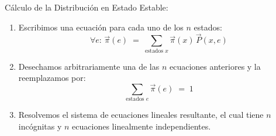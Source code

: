 \documentclass[ 10pt, xcolor = dvipsnames]{beamer}
\begin{document}
\begin{frame}[allowframebreaks]
\end{frame}

\begin{frame}[allowframebreaks]
\frametitle{\insertsubsection}

C\'alculo de la Distribuci\'on en Estado Estable: 
\begin{enumerate}
\item Escribimos una ecuaci\'on para cada uno de los $n$ estados: 
\[
\forall e \colon \, \vec{\pi}(e) \; = \; 
\sum_{\text{estados }x} \vec{\pi}(x) \, \vec{P}(x,e) 
\]
\item Desechamos arbitrariamente una de las $n$ ecuaciones anteriores y la reemplazamos por: 
\[
\sum_{\text{estados }e} \vec{\pi}(e) \; = \; 1
\]
\item Resolvemos el sistema de ecuaciones lineales resultante, el cual tiene \linebreak $n$ inc\'ognitas y $n$ ecuaciones linealmente independientes. 

\end{enumerate}

\end{frame}
\end{document}
